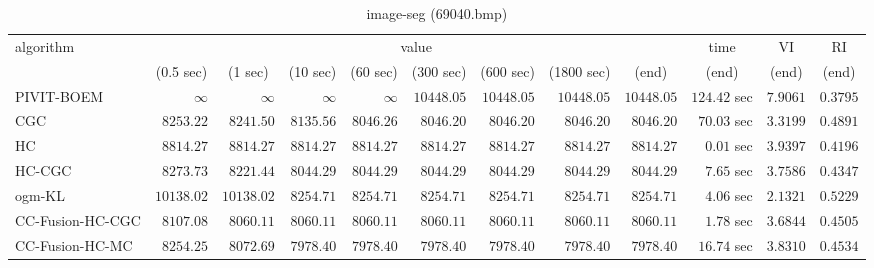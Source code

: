 \begin{table}[H]
\scriptsize
\centering
\caption{image-seg (69040.bmp)}
\label{tab:anytimetable-image-seg-69040.bmp}
\begin{tabular}{lrrrrrrrrrrr}
\toprule
           algorithm &                                   \multicolumn{8}{c}{value} & \multicolumn{1}{c}{time}    & \multicolumn{1}{c}{VI}  & \multicolumn{1}{c}{RI} \\  
\cmidrule(lr){2-9}\cmidrule(lr){10-10} \cmidrule(lr){11-11} \cmidrule(lr){12-12}   
                     & \multicolumn{1}{c}{(0.5 sec)} & \multicolumn{1}{c}{(1 sec)} & \multicolumn{1}{c}{(10 sec)} & \multicolumn{1}{c}{(60 sec)} & \multicolumn{1}{c}{(300 sec)} & \multicolumn{1}{c}{(600 sec)} & \multicolumn{1}{c}{(1800 sec)} & \multicolumn{1}{c}{(end)} & \multicolumn{1}{c}{(end)}    & \multicolumn{1}{c}{(end)}   & \multicolumn{1}{c}{(end)}  \\ \midrule 
          PIVIT-BOEM & $\infty$ & $\infty$ & $\infty$ & $\infty$ & $     10448.05$ & $     10448.05$ & $     10448.05$ & $     10448.05$ & $       124.42$ sec    & $       7.9061$  & $       0.3795$ \\ 
                 CGC & $      8253.22$ & $      8241.50$ & $      8135.56$ & $      8046.26$ & $      8046.20$ & $      8046.20$ & $      8046.20$ & $      8046.20$ & $        70.03$ sec    & $       3.3199$  & $       0.4891$ \\ 
                  HC & $      8814.27$ & $      8814.27$ & $      8814.27$ & $      8814.27$ & $      8814.27$ & $      8814.27$ & $      8814.27$ & $      8814.27$ & $         0.01$ sec    & $       3.9397$  & $       0.4196$ \\ 
              HC-CGC & $      8273.73$ & $      8221.44$ & $      8044.29$ & $      8044.29$ & $      8044.29$ & $      8044.29$ & $      8044.29$ & $      8044.29$ & $         7.65$ sec    & $       3.7586$  & $       0.4347$ \\ 
              ogm-KL & $     10138.02$ & $     10138.02$ & $      8254.71$ & $      8254.71$ & $      8254.71$ & $      8254.71$ & $      8254.71$ & $      8254.71$ & $         4.06$ sec    & $       2.1321$  & $       0.5229$ \\ 
    CC-Fusion-HC-CGC & $      8107.08$ & $      8060.11$ & $      8060.11$ & $      8060.11$ & $      8060.11$ & $      8060.11$ & $      8060.11$ & $      8060.11$ & $         1.78$ sec    & $       3.6844$  & $       0.4505$ \\ 
     CC-Fusion-HC-MC & $      8254.25$ & $      8072.69$ & $      7978.40$ & $      7978.40$ & $      7978.40$ & $      7978.40$ & $      7978.40$ & $      7978.40$ & $        16.74$ sec    & $       3.8310$  & $       0.4534$ \\ 

\end{tabular}
\end{table}
